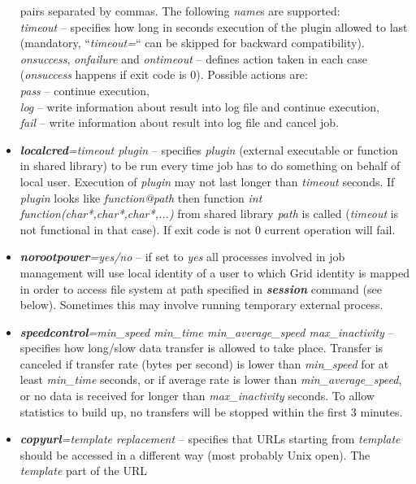 \documentclass{article}                            %
\begin{document}
\begin{itemize}
pairs separated by commas. The following \textit{name}s are supported:\\
\textit{timeout} -- specifies how long in seconds execution of the
plugin allowed to last (mandatory, {}``\textit{timeout=}{}`` can
be skipped for backward compatibility).\\
\textit{onsuccess}, \textit{onfailure} and \textit{ontimeout} -- defines
action taken in each case (\textit{onsuccess} happens if exit code
is 0). Possible actions are:\\
\textit{pass} -- continue execution,\\
\textit{log} -- write information about result into log file and continue
execution,\\
\textit{fail} -- write information about result into log file and cancel
job.
\item \textbf{\textit{localcred}}\textit{=timeout plugin} -- specifies \emph{plugin}
(external executable or function in shared library) to be run every
time job has to do something on behalf of local user. Execution of
\emph{plugin} may not last longer than \emph{timeout} seconds. If
\emph{plugin} looks like \emph{function@path} then function \emph{int
function(char{*},char{*},char{*},...)} from shared library \emph{path}
is called (\emph{timeout} is not functional in that case). If exit
code is not 0 current operation will fail.
\item \textbf{\textit{norootpower}}\textit{=yes/no} -- if set to \emph{yes}
all processes involved in job management will use local identity of
a user to which Grid identity is mapped in order to access file system
at path specified in \textbf{\textit{session}} command (see below).
Sometimes this may involve running temporary external process.
\item \textbf{\textit{speedcontrol}}\textit{=min\_speed min\_time min\_average\_speed
max\_inactivity} -- specifies how long/slow data transfer is allowed
to take place. Transfer is canceled if transfer rate (bytes per second)
is lower than \emph{min\_speed} for at least \emph{min\_time} seconds,
or if average rate is lower than \emph{min\_average\_speed}, or no
data is received for longer than \textit{max\_inactivity} seconds. To
allow statistics to build up, no transfers will be stopped within the
first 3 minutes.
\item \textbf{\textit{copyurl}}\textit{=template replacement} -- specifies
that URLs starting from \emph{template} should be accessed in a different
way (most probably Unix open). The \textit{template} part of the URL

\end{itemize}
\end{document}

